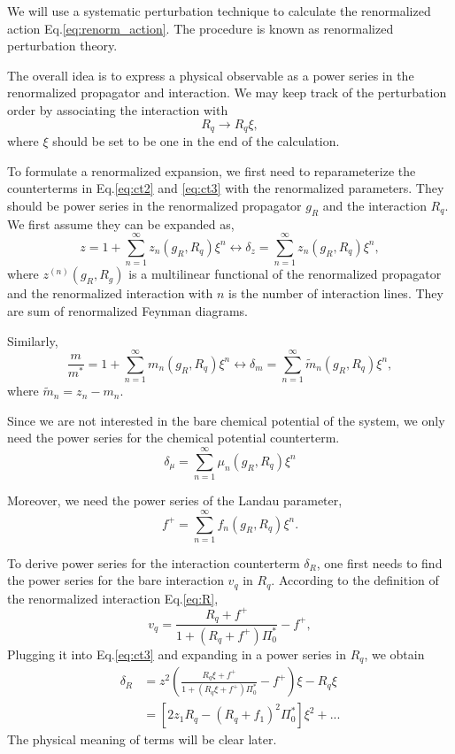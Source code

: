 \documentclass[reprint,amsmath,amssymb,aps,prb]{revtex4-1}
\begin{document}
We will use a systematic perturbation technique to calculate the renormalized action Eq.\eqref{eq:renorm_action}. The procedure is known as renormalized perturbation theory.

The overall idea is to express a physical observable as a power series in the renormalized propagator and interaction. We may keep track of the perturbation order by associating the interaction with
\begin{equation}
    R_q \rightarrow R_q\xi,
\end{equation}
where $\xi$ should be set to be one in the end of the calculation.

To formulate a renormalized expansion, we first need to reparameterize the counterterms in Eq.\eqref{eq:ct2} and \eqref{eq:ct3} with the renormalized parameters.
They should be power series in the renormalized propagator $g_R$ and the interaction $R_q$. We first assume they can be expanded as,
\begin{equation}
    z=1+\sum_{n=1}^\infty z_n(g_R, R_q)\xi^n \leftrightarrow \delta_z= \sum_{n=1}^\infty z_n(g_R, R_q)\xi^n,
\end{equation}
where $z^{(n)}(g_R, R_g)$ is a multilinear functional of the renormalized propagator and the renormalized interaction with $n$ is the number of interaction lines. They are sum of renormalized Feynman diagrams.

Similarly,
\begin{equation}
    \frac{m}{m^*}=1+\sum_{n=1}^\infty m_n(g_R, R_q)\xi^n \leftrightarrow \delta_m= \sum_{n=1}^\infty \tilde{m}_n(g_R, R_q)\xi^n,
\end{equation}
where $\tilde{m}_n = z_n-m_n$.

Since we are not interested in the bare chemical potential of the system, we only need the power series for the chemical potential counterterm.
\begin{equation}
    \delta_\mu= \sum_{n=1}^\infty \mu_n(g_R, R_q)\xi^n
\end{equation}

Moreover, we need the power series of the Landau parameter,
\begin{equation}
    f^+= \sum_{n=1}^\infty f_n(g_R, R_q)\xi^n.
\end{equation}

To derive power series for the interaction counterterm $\delta_R$, one first needs to find the power series for the bare interaction $v_q$ in $R_q$.
According to the definition of the renormalized interaction Eq.\eqref{eq:R},
\begin{equation}
    v_q = \frac{R_q+f^+}{1+(R_q+f^+)\Pi_0^*}-f^+,
\end{equation}
Plugging it into Eq.\eqref{eq:ct3} and expanding in a power series in $R_q$, we obtain
\begin{align}
    \delta_R & =  z^2\left(\frac{R_q\xi+f^+}{1+(R_q\xi+f^+)\Pi_0^*}-f^+\right)\xi - R_q\xi \\
             & =           \left[2z_1 R_q-(R_q+f_1)^2\Pi_0^*\right]\xi^2+...
\end{align}
The physical meaning of terms will be clear later.
\end{document}
